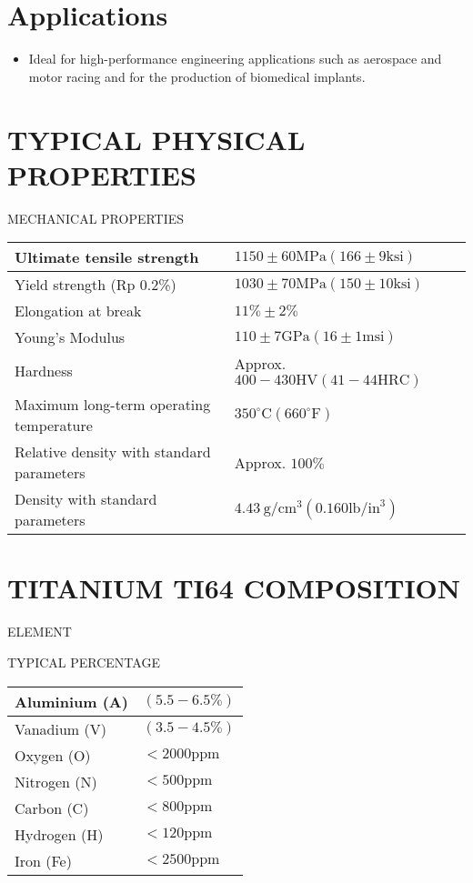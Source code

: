 \documentclass[10pt]{article}
\begin{document}
\section*{Applications}
\begin{itemize}
  \item Ideal for high-performance engineering applications such as aerospace and motor racing and for the production of biomedical implants.
\end{itemize}

\section*{TYPICAL PHYSICAL PROPERTIES}
MECHANICAL PROPERTIES

\begin{center}
\begin{tabular}{|l|l|}
\hline
Ultimate tensile strength & $1150 \pm 60 \mathrm{MPa}(166 \pm 9 \mathrm{ksi})$ \\
\hline
Yield strength (Rp 0.2\%) & $1030 \pm 70 \mathrm{MPa}(150 \pm 10 \mathrm{ksi})$ \\
\hline
Elongation at break & $11 \% \pm 2 \%$ \\
\hline
Young's Modulus & $110 \pm 7 \mathrm{GPa}(16 \pm 1 \mathrm{msi})$ \\
\hline
Hardness & Approx. $400-430 \mathrm{HV}(41-44 \mathrm{HRC})$ \\
\hline
Maximum long-term operating temperature & $350^{\circ} \mathrm{C}\left(660^{\circ} \mathrm{F}\right)$ \\
\hline
Relative density with standard parameters & Approx. $100 \%$ \\
\hline
Density with standard parameters & $4.43 \mathrm{~g} / \mathrm{cm}^{3}\left(0.160 \mathrm{lb} / \mathrm{in}^{3}\right)$ \\
\hline
\end{tabular}
\end{center}

\section*{TITANIUM TI64 COMPOSITION}
ELEMENT

TYPICAL PERCENTAGE

\begin{center}
\begin{tabular}{|l|l|}
\hline
Aluminium (A) & $(5.5-6.5 \%)$ \\
\hline
Vanadium (V) & $(3.5-4.5 \%)$ \\
\hline
Oxygen (O) & $<2000 \mathrm{ppm}$ \\
\hline
Nitrogen (N) & $<500 \mathrm{ppm}$ \\
\hline
Carbon (C) & $<800 \mathrm{ppm}$ \\
\hline
Hydrogen (H) & $<120 \mathrm{ppm}$ \\
\hline
Iron (Fe) & $<2500 \mathrm{ppm}$ \\
\hline
\end{tabular}
\end{center}
\end{document}
